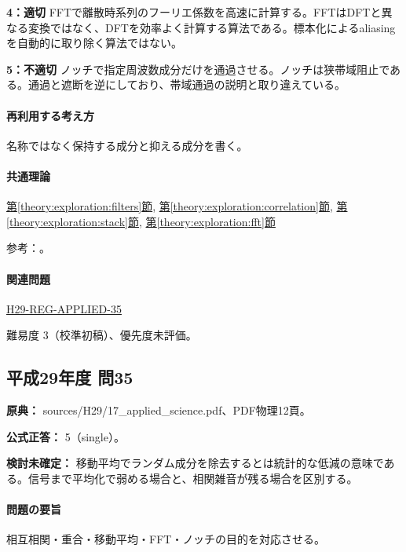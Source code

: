 \noindent\textbf{4：適切} FFTで離散時系列のフーリエ係数を高速に計算する。FFTはDFTと異なる変換ではなく、DFTを効率よく計算する算法である。標本化によるaliasingを自動的に取り除く算法ではない。\par

\noindent\textbf{5：不適切} ノッチで指定周波数成分だけを通過させる。ノッチは狭帯域阻止である。通過と遮断を逆にしており、帯域通過の説明と取り違えている。\par

\paragraph{再利用する考え方} 名称ではなく保持する成分と抑える成分を書く。

\paragraph{共通理論} \hyperref[theory:exploration:filters]{第\ref*{theory:exploration:filters}節}, \hyperref[theory:exploration:correlation]{第\ref*{theory:exploration:correlation}節}, \hyperref[theory:exploration:stack]{第\ref*{theory:exploration:stack}節}, \hyperref[theory:exploration:fft]{第\ref*{theory:exploration:fft}節}

\par 参考：\cite{mit_signals2010,mit_moving2012,scipy_notch,scipy_fft,usgs_processing2000}。

\paragraph{関連問題} \hyperref[q:h29-reg-applied-35]{H29-REG-APPLIED-35}

\par 難易度 3（校準初稿）、優先度未評価。

\subsection{平成29年度 問35}
\label{q:h29-reg-applied-35}

\noindent\textbf{原典：} sources/H29/17\_applied\_science.pdf、PDF物理12頁。

\textbf{公式正答：} 5（single）。

\par\textbf{検討未確定：} 移動平均でランダム成分を除去するとは統計的な低減の意味である。信号まで平均化で弱める場合と、相関雑音が残る場合を区別する。

\paragraph{問題の要旨} 相互相関・重合・移動平均・FFT・ノッチの目的を対応させる。

